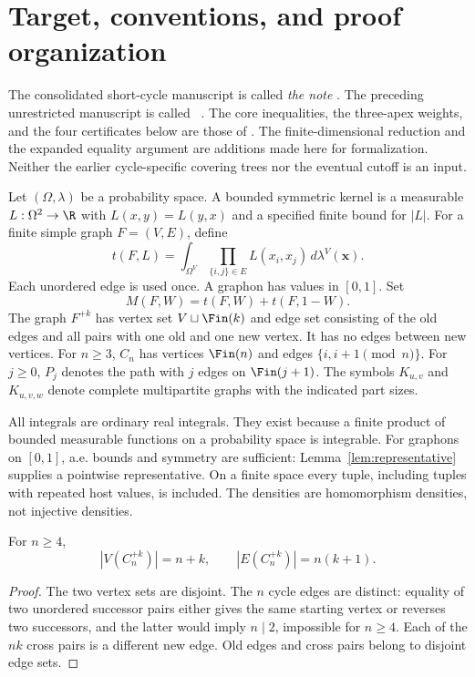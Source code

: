 \clearpage
\tableofcontents
\clearpage

\section{Target, conventions, and proof organization}
\label{sec:target}

The consolidated short-cycle manuscript is called \emph{the note} \cite{note}.  The preceding
unrestricted manuscript is called \sourceuniversal\ \cite{universal}.  The core inequalities,
the three-apex weights, and the four certificates below are those of \sourceuniversal.
The finite-dimensional reduction and the expanded equality argument are additions made
here for formalization.  Neither the earlier cycle-specific covering trees nor the eventual
cutoff is an input.

\begin{definition}
\label{def:densities}
Let $(\Omega,\lambda)$ be a probability space.  A bounded symmetric kernel is a measurable
$L:\Omega^2\to\R$ with $L(x,y)=L(y,x)$ and a specified finite bound for $|L|$.
For a finite simple graph $F=(V,E)$, define
\[
 t(F,L)=\int_{\Omega^V}\prod_{\{i,j\}\in E}L(x_i,x_j)\,d\lambda^V(\mathbf x).
\]
Each unordered edge is used once.  A graphon has values in $[0,1]$.  Set
\[
 M(F,W)=t(F,W)+t(F,1-W).
\]
The graph $F^{+k}$ has vertex set $V\sqcup\Fin(k)$ and edge set consisting of the old edges
and all pairs with one old and one new vertex.  It has no edges between new vertices.
For $n\ge3$, $C_n$ has vertices $\Fin(n)$ and edges $\{i,i+1\pmod n\}$.
For $j\ge0$, $P_j$ denotes the path with $j$ edges on $\Fin(j+1)$.  The symbols
$K_{u,v}$ and $K_{u,v,w}$ denote complete multipartite graphs with the indicated part sizes.
\end{definition}

All integrals are ordinary real integrals.  They exist because a finite product of bounded
measurable functions on a probability space is integrable.  For graphons on $[0,1]$, a.e.
bounds and symmetry are sufficient: Lemma~\ref{lem:representative} supplies a pointwise
representative.  On a finite space every tuple, including tuples with repeated host values,
is included.  The densities are homomorphism densities, not injective densities.

\begin{lemma}
\label{lem:counts}
\proved For $n\ge4$,
\[
 |V(C_n^{+k})|=n+k,\qquad |E(C_n^{+k})|=n(k+1).
\]
\end{lemma}
\begin{proof}
The two vertex sets are disjoint.  The $n$ cycle edges are distinct: equality of two unordered
successor pairs either gives the same starting vertex or reverses two successors, and the
latter would imply $n\mid2$, impossible for $n\ge4$.  Each of the $nk$ cross pairs is a
different new edge.  Old edges and cross pairs belong to disjoint edge sets.
\end{proof}

